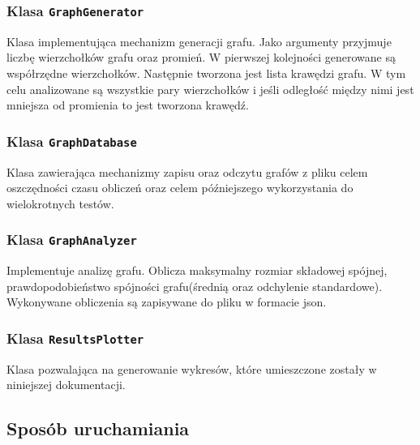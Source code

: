 		\subsubsection{Klasa \texttt{GraphGenerator}}
			Klasa implementująca mechanizm generacji grafu. Jako argumenty przyjmuje liczbę wierzchołków grafu oraz promień. W pierwszej kolejności generowane są współrzędne wierzchołków. Następnie tworzona jest lista krawędzi grafu. W tym celu analizowane są wszystkie pary wierzchołków i jeśli odległość między nimi jest mniejsza od promienia to jest tworzona krawędź.
		\subsubsection{Klasa \texttt{GraphDatabase}}
			Klasa zawierająca mechanizmy zapisu oraz odczytu grafów z pliku celem oszczędności czasu obliczeń oraz celem późniejszego wykorzystania do wielokrotnych testów.
		\subsubsection{Klasa \texttt{GraphAnalyzer}}
			Implementuje analizę grafu. Oblicza maksymalny rozmiar składowej spójnej, prawdopodobieństwo spójności grafu(średnią oraz odchylenie standardowe). Wykonywane obliczenia są zapisywane do pliku w formacie json.
		\subsubsection{Klasa \texttt{ResultsPlotter}}
			Klasa pozwalająca na generowanie wykresów, które umieszczone zostały w niniejszej dokumentacji.

	\subsection{Sposób uruchamiania}
		\label{final:struktura:uruchamianie}

